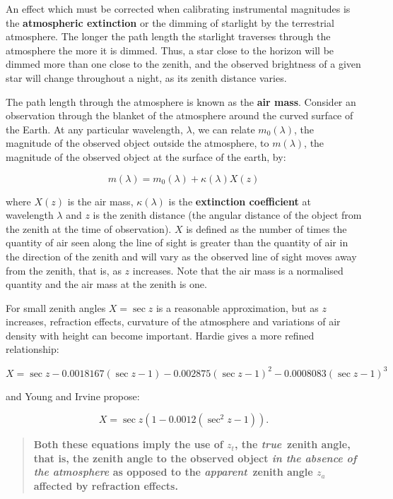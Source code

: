 \documentclass[twoside,11pt]{article}
\begin{document}
An effect which must be corrected when calibrating instrumental
magnitudes is the {\bf atmospheric extinction} or the dimming of
starlight by the terrestrial atmosphere.  The longer the path length
the starlight traverses through the atmosphere the more it is
dimmed.  Thus, a star close to the horizon will be dimmed more than one
close to the zenith, and the observed brightness of a given star will
change throughout a night, as its zenith distance varies.

The path length through the atmosphere is known as the {\bf air mass}.
Consider an observation through the blanket of the atmosphere around
the curved surface of the Earth. At any particular wavelength, $\lambda$,
we can relate $m_0(\lambda)$, the magnitude of the observed object
outside the atmosphere, to $m(\lambda)$, the magnitude of the observed
object at the surface of the earth, by:

\begin{equation}
m(\lambda) = m_0(\lambda)  + \kappa(\lambda)X(z)
\end{equation}

where $X(z)$ is the air mass, $\kappa(\lambda)$ is the {\bf extinction
coefficient} at wavelength $\lambda$ and $z$ is the zenith distance (the
angular distance of the object from the zenith at the time of observation).
$X$ is defined as the number of times the quantity of air seen along the
line of sight is greater than the quantity of air in the direction of the
zenith and will vary as the observed line of sight moves away from the
zenith, that is, as $z$ increases.  Note that the air mass is a
normalised quantity and the air mass at the zenith is one.

For small zenith angles $X=\sec z$ is a reasonable approximation, but
as $z$ increases, refraction effects, curvature of the atmosphere and
variations of air density with height can become important.
Hardie\cite{HARDIE62} gives a more refined relationship:

\begin{equation}
X= \sec z - 0.0018167(\sec z -1) - 0.002875(\sec z -1)^2 -
0.0008083(\sec z -1)^3
\end{equation}

and Young and Irvine\cite{YOUNG67} propose:

\begin{equation}
X= \sec z \left( 1 - 0.0012 (\sec^2 z-1) \right) .
\end{equation}

\begin{quote}
{\bf Both these equations imply the use of $z_t$, the {\it true}\, zenith
angle, that is, the zenith angle to the observed object {\it in the
absence of the atmosphere} as opposed to the {\it apparent}\, zenith
angle $z_a$ affected by refraction effects.}
\end{quote}
\end{document}
